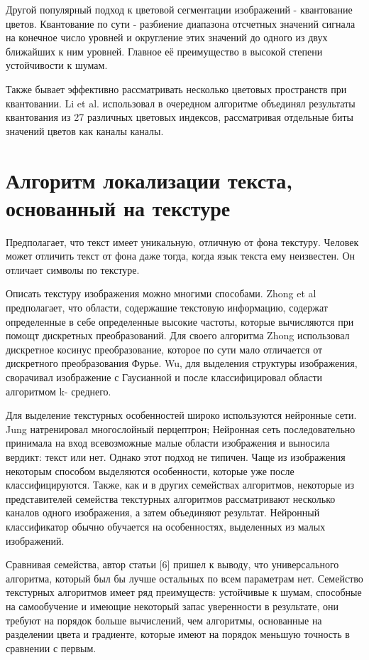 \documentclass[oneside,final,14pt]{extreport}
\begin{document}
Другой популярный подход к цветовой сегментации изображений - квантование цветов. Квантование по сути - разбиение диапазона отсчетных значений сигнала на конечное число уровней и округление этих значений до одного из двух ближайших к ним уровней. Главное её преимущество в высокой степени устойчивости к шумам. 

Также бывает эффективно рассматривать несколько цветовых пространств при квантовании. Li et al. использовал в очередном алгоритме объединял результаты квантования из 27 различных цветовых индексов, рассматривая  отдельные биты значений цветов как каналы каналы. 

\section{Алгоритм локализации текста, основанный на текстуре}

Предполагает, что текст имеет уникальную, отличную от фона текстуру. Человек может отличить текст от фона даже тогда, когда язык текста ему неизвестен. Он отличает символы по текстуре. 

Описать текстуру изображения можно многими способами. Zhong et al предполагает, что области, содержашие текстовую информацию, содержат определенные в себе определенные высокие частоты, которые вычисляются при помощт дискретных преобразований. Для  своего алгоритма Zhong использовал дискретное косинус преобразование, которое по сути мало отличается от дискретного преобразования Фурье.  Wu, для выделения структуры изображения, сворачивал изображение с Гаусианной и после классифицировал области алгоритмом k- среднего.

Для выделение текстурных особенностей широко используются нейронные сети. Jung  натренировал многослойный перцептрон; Нейронная сеть последовательно принимала на вход всевозможные малые области изображения и выносила вердикт: текст или нет. Однако этот подход не типичен. Чаще из изображения некоторым способом выделяются особенности, которые уже после классифицируются.  Также, как и в других семействах алгоритмов, некоторые из представителей семейства текстурных алгоритмов рассматривают несколько каналов одного изображения, а затем объединяют результат. Нейронный классификатор обычно обучается на особенностях, выделенных из малых изображений.  

Сравнивая семейства, автор статьи [6] пришел к выводу, что универсального алгоритма, который был бы лучше остальных по всем параметрам нет.  Семейство текстурных алгоритмов имеет ряд преимуществ: устойчивые к шумам, способные на самообучение и имеющие некоторый запас уверенности в результате, они требуют на порядок больше вычислений, чем алгоритмы, основанные на разделении цвета и градиенте, которые имеют на порядок меньшую точность в сравнении с первым. 
\end{document}
